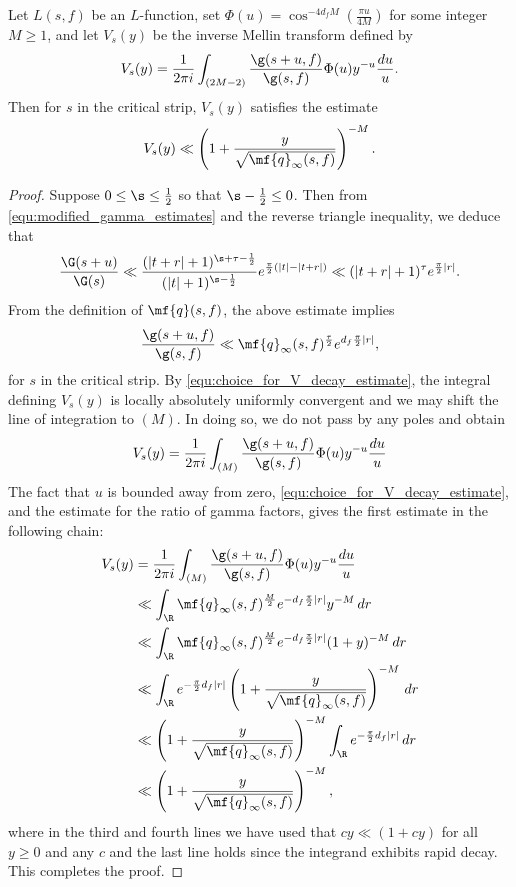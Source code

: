     \begin{proposition}\label{prop:V_function_decay}
      Let $L(s,f)$ be an $L$-function, set $\Phi(u) = \cos^{-4d_{f}M}\left(\frac{\pi u}{4M}\right)$ for some integer $M \ge 1$, and let $V_{s}(y)$ be the inverse Mellin transform defined by
      \[
        V_{s}(y) = \frac{1}{2\pi i}\int_{(2M-2)}\frac{\g(s+u,f)}{\g(s,f)}\Phi(u)y^{-u}\frac{du}{u}.
      \]
      Then for $s$ in the critical strip, $V_{s}(y)$ satisfies the estimate
      \[
        V_{s}(y) \ll \left(1+\frac{y}{\sqrt{\mf{q}_{\infty}(s,f)}}\right)^{-M}.
      \]
    \end{proposition}
    \begin{proof}
      Suppose $0 \le \s \le \frac{1}{2}$ so that $\s-\frac{1}{2} \le 0$. Then from \cref{equ:modified_gamma_estimates} and the reverse triangle inequality, we deduce that
      \[
        \frac{\G(s+u)}{\G(s)} \ll \frac{(|t+r|+1)^{\s+\tau-\frac{1}{2}}}{(|t|+1)^{\s-\frac{1}{2}}}e^{\frac{\pi}{2}(|t|-|t+r|)} \ll (|t+r|+1)^{\tau}e^{\frac{\pi}{2}|r|}.
      \]
      From the definition of $\mf{q}(s,f)$, the above estimate implies
      \[
        \frac{\g(s+u,f)}{\g(s,f)} \ll \mf{q}_{\infty}(s,f)^{\frac{\tau}{2}}e^{d_{f}\frac{\pi}{2}|r|},
      \]
      for $s$ in the critical strip. By \cref{equ:choice_for_V_decay_estimate}, the integral defining $V_{s}(y)$ is locally absolutely uniformly convergent and we may shift the line of integration to $(M)$. In doing so, we do not pass by any poles and obtain
      \[
        V_{s}(y) = \frac{1}{2\pi i}\int_{(M)}\frac{\g(s+u,f)}{\g(s,f)}\Phi(u)y^{-u}\frac{du}{u} \\
      \]
      The fact that $u$ is bounded away from zero, \cref{equ:choice_for_V_decay_estimate}, and the estimate for the ratio of gamma factors, gives the first estimate in the following chain:
      \begin{align*}
        V_{s}(y) &= \frac{1}{2\pi i}\int_{(M)}\frac{\g(s+u,f)}{\g(s,f)}\Phi(u)y^{-u}\frac{du}{u} \\
        &\ll \int_{\R}\mf{q}_{\infty}(s,f)^{\frac{M}{2}}e^{-d_{f}\frac{\pi}{2}|r|}y^{-M}\,dr \\
        &\ll \int_{\R}\mf{q}_{\infty}(s,f)^{\frac{M}{2}}e^{-d_{f}\frac{\pi}{2}|r|}(1+y)^{-M}\,dr \\
        &\ll \int_{\R}e^{-\frac{\pi}{2}d_{f}|r|}\left(1+\frac{y}{\sqrt{\mf{q}_{\infty}(s,f)}}\right)^{-M}\,dr \\
        &\ll \left(1+\frac{y}{\sqrt{\mf{q}_{\infty}(s,f)}}\right)^{-M}\int_{\R}e^{-\frac{\pi}{2}d_{f}|r|}\,dr \\
        &\ll \left(1+\frac{y}{\sqrt{\mf{q}_{\infty}(s,f)}}\right)^{-M},
      \end{align*}
      where in the third and fourth lines we have used that $cy \ll (1+cy)$ for all $y \ge 0$ and any $c$ and the last line holds since the integrand exhibits rapid decay. This completes the proof.
    \end{proof}

